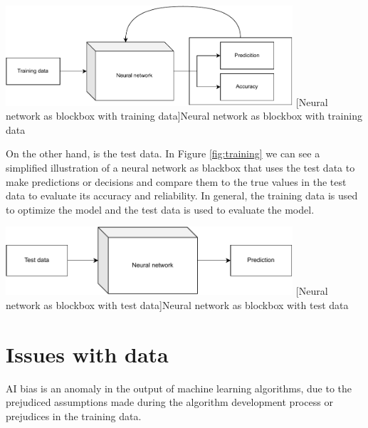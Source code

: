 \documentclass[
	12pt,
    a4paper,
    egregdoesnotlikesansseriftitles, %
    toc=chapterentrywithdots,
    oneside, openany,
    titlepage,
    parskip=half,
    headings=normal,  %
    listof=totoc,
    bibliography=totocnumbered,
    index=totoc,
    captions=tableheading,  %
    listof=flat,
    numbers=noenddot, %
    final]
    {scrbook}
\begin{document}
\vspace{1em}
\begin{minipage}{\linewidth}
	\centering
	\includegraphics[width=0.8\textwidth]{figures/training.pdf}
	[Neural network as blockbox with training data]{Neural network as blockbox with training data}
	\label{fig:training}
\end{minipage}

On the other hand, is the test data. 
In Figure \ref{fig:training} we can see a simplified illustration of a neural network as blackbox that uses the test data to make predictions or decisions and compare them to the true values in the test data to evaluate its accuracy and reliability. 
In general, the training data is used to optimize the model and the test data is used to evaluate the model. \cite[p. 32-33]{khan_guide_2018}



\vspace{1em}
\begin{minipage}{\linewidth}
	\centering
	\includegraphics[width=0.8\textwidth]{figures/test.pdf}
	[Neural network as blockbox with test data]{Neural network as blockbox with test data}
	\label{fig:test}
\end{minipage}



\chapter{Issues with data}
AI bias is an anomaly in the output of machine learning algorithms, due to the prejudiced assumptions made during the algorithm development process or prejudices in the training data.
 
\end{document}
